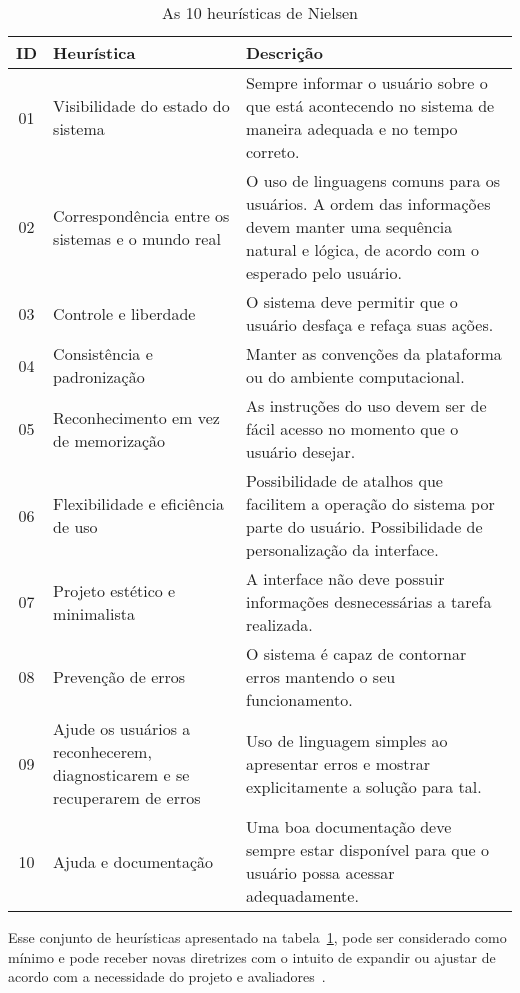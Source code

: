 \begin{table}[!ht]
	\caption{As 10 heurísticas de Nielsen}
	\label{tab:heuristicasnielsen}
	\centering
	\begin{tabular}{ c | m{4cm} | m{10cm} }
		\hline
		ID & Heurística & Descrição \\
		\hline
		01 & Visibilidade do estado do sistema & Sempre informar o usuário sobre o que está acontecendo no sistema de maneira adequada e no tempo correto. \\
		\hline
        02 & Correspondência entre os sistemas e o mundo real & O uso de linguagens comuns para os usuários. A ordem das informações devem manter uma sequência natural e lógica, de acordo com o esperado pelo usuário. \\
		\hline
        03 & Controle e liberdade & O sistema deve permitir que o usuário desfaça e refaça suas ações. \\
		\hline
        04 & Consistência e padronização & Manter as convenções da plataforma ou do ambiente computacional. \\
		\hline
        05 & Reconhecimento em vez de memorização & As instruções do uso devem ser de fácil acesso no momento que o usuário desejar. \\
		\hline
        06 & Flexibilidade e eficiência de uso & Possibilidade de atalhos que facilitem a operação do sistema por parte do usuário. Possibilidade de personalização da interface. \\
		\hline
        07 & Projeto estético e minimalista & A interface não deve possuir informações desnecessárias a tarefa realizada. \\
		\hline
        08 & Prevenção de erros & O sistema é capaz de contornar erros mantendo o seu funcionamento. \\
		\hline
        09 & Ajude os usuários a reconhecerem, diagnosticarem e se recuperarem de erros & Uso de linguagem simples ao apresentar erros e mostrar explicitamente a solução para tal. \\
		\hline
        10 & Ajuda e documentação & Uma boa documentação deve sempre estar disponível para que o usuário possa acessar adequadamente. \\
		\hline
	\end{tabular}
\end{table}

Esse conjunto de heurísticas apresentado na tabela~\ref{tab:heuristicasnielsen}, pode ser considerado como mínimo e pode receber novas diretrizes com o intuito de expandir ou ajustar de acordo com a necessidade do projeto e avaliadores~\cite{barbosa:2010, benyon:2011}.

